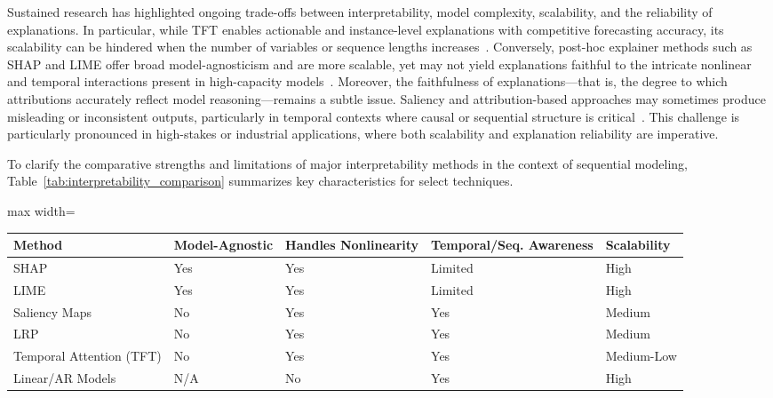 Sustained research has highlighted ongoing trade-offs between interpretability, model complexity, scalability, and the reliability of explanations. In particular, while TFT enables actionable and instance-level explanations with competitive forecasting accuracy, its scalability can be hindered when the number of variables or sequence lengths increases~\cite{ref31}\cite{ref62}\cite{ref67}. Conversely, post-hoc explainer methods such as SHAP and LIME offer broad model-agnosticism and are more scalable, yet may not yield explanations faithful to the intricate nonlinear and temporal interactions present in high-capacity models~\cite{ref31}\cite{ref67}\cite{ref69}\cite{ref79}. Moreover, the faithfulness of explanations—that is, the degree to which attributions accurately reflect model reasoning—remains a subtle issue. Saliency and attribution-based approaches may sometimes produce misleading or inconsistent outputs, particularly in temporal contexts where causal or sequential structure is critical~\cite{ref55}\cite{ref86}. This challenge is particularly pronounced in high-stakes or industrial applications, where both scalability and explanation reliability are imperative.

To clarify the comparative strengths and limitations of major interpretability methods in the context of sequential modeling, Table~\ref{tab:interpretability_comparison} summarizes key characteristics for select techniques.

\begin{table*}[htbp]
\centering
\caption{Comparative overview of interpretability approaches for time series and sequential models.}
\label{tab:interpretability_comparison}
\begin{adjustbox}{max width=\textwidth}
\begin{tabular}{lllll}
\toprule
\textbf{Method} & \textbf{Model-Agnostic} & \textbf{Handles Nonlinearity} & \textbf{Temporal/Seq. Awareness} & \textbf{Scalability} \\
\midrule
SHAP                    & Yes   & Yes        & Limited     & High   \\
LIME                    & Yes   & Yes        & Limited     & High   \\
Saliency Maps           & No    & Yes        & Yes         & Medium \\
LRP                     & No    & Yes        & Yes         & Medium \\
Temporal Attention (TFT)& No    & Yes        & Yes         & Medium-Low \\
Linear/AR Models        & N/A   & No         & Yes         & High   \\
\bottomrule
\end{tabular}
\end{adjustbox}
\end{table*}

